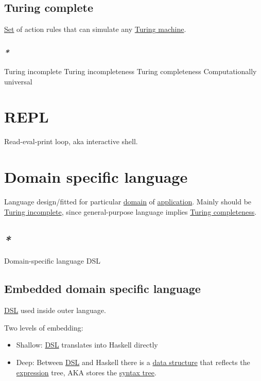 \documentclass[a4paper,14pt,oneside]{book}
\begin{document}
\subsection{\label{org3f33d72}Turing complete}
\label{sec:org6679325}

\hyperref[org6b6e43e]{Set} of action rules that can simulate any \hyperref[org821ef3a]{Turing machine}.

\subsubsection{\emph{*}}
\label{sec:orgf325ff0}

\label{orgb935e12}Turing incomplete
\label{orgfff5b4c}Turing incompleteness
\label{org5f72959}Turing completeness
\label{orgbb67ce9}Computationally universal

\section{\label{org5db0329}REPL}
\label{sec:orgeb7fb61}
Read-eval-print loop, aka interactive shell.

\section{\label{org1550ee4}Domain specific language}
\label{sec:org044550a}
Language design/fitted for particular \hyperref[org6c7498b]{domain} of \hyperref[org5ea1552]{application}. Mainly should be \hyperref[orgb935e12]{Turing incomplete}, since general-purpose language implies \hyperref[org5f72959]{Turing completeness}.

\subsection{\emph{*}}
\label{sec:org63637b0}

\label{org80393bc}Domain-specific language
\label{org1ab8402}DSL

\subsection{\label{orgfc8a200}Embedded domain specific language}
\label{sec:org1db37a2}

\hyperref[org1ab8402]{DSL} used inside outer language.

Two levels of embedding:

\begin{itemize}
\item Shallow: \hyperref[org1ab8402]{DSL} translates into Haskell directly
\item Deep: Between \hyperref[org1ab8402]{DSL} and Haskell there is a \hyperref[org8fcbf29]{data structure} that reflects the \hyperref[orgbe3746b]{expression} tree, AKA stores the \hyperref[orga42a278]{syntax tree}.
\end{itemize}
\end{document}

